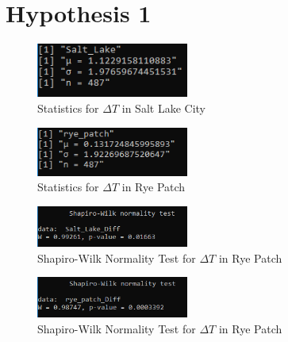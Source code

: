 \documentclass[final]{siamart1116}
\begin{document}
\section{Hypothesis 1}

\begin{figure}
  \centering
  \includegraphics[width=5cm]{../data/img/Salt_Lake_Temp_Diff_Stats.PNG}
  \caption{Statistics for $\Delta T$ in Salt Lake City}
  \label{fig:slc_diff_statistics}
\end{figure}

\begin{figure}
  \centering
  \includegraphics[width=5cm]{../data/img/Rye_Patch_Temp_Diff_Stats.PNG}
  \caption{Statistics for $\Delta T$ in Rye Patch}
  \label{fig:rp_diff_statistics}
\end{figure}

\begin{figure}
  \centering
  \includegraphics[width=5cm]{../data/img/Salt_Lake_Temp_Diff_Shapiro.PNG}
  \caption{Shapiro-Wilk Normality Test for $\Delta T$ in Rye Patch}
  \label{fig:slc_diff_shapiro}
\end{figure}

\begin{figure}
  \centering
  \includegraphics[width=5cm]{../data/img/Rye_Patch_Temp_Diff_Shapiro.PNG}
  \caption{Shapiro-Wilk Normality Test for $\Delta T$ in Rye Patch}
  \label{fig:rp_diff_shapiro}
\end{figure}
\end{document}
